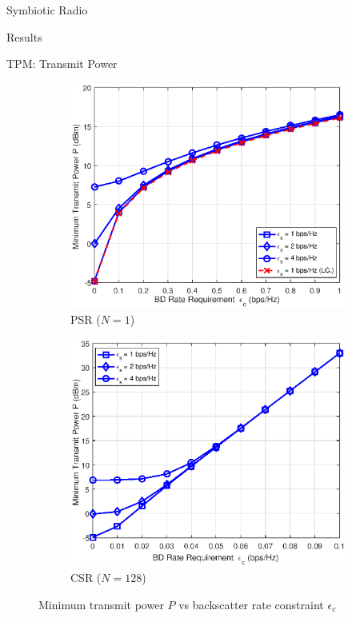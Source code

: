 \documentclass[9pt]{beamer}
\begin{document}
\begin{section}{Symbiotic Radio}
\begin{subsection}{Results}
			\begin{frame}{TPM: Transmit Power}
				\begin{figure}
					\centering
					\begin{subfigure}{.45\textwidth}
						\centering
						\includegraphics[width=\linewidth]{assets/psr_power_rc.eps}
						\caption{PSR ($N=1$)}
					\end{subfigure}
					\begin{subfigure}{.45\textwidth}
						\centering
						\includegraphics[width=\linewidth]{assets/csr_power_rc.eps}
						\caption{CSR ($N=128$)}
					\end{subfigure}
					\caption{Minimum transmit power $P$ vs backscatter rate constraint $\epsilon_c$}
				\end{figure}
			\end{frame}


\end{subsection}
\end{section}
\end{document}
